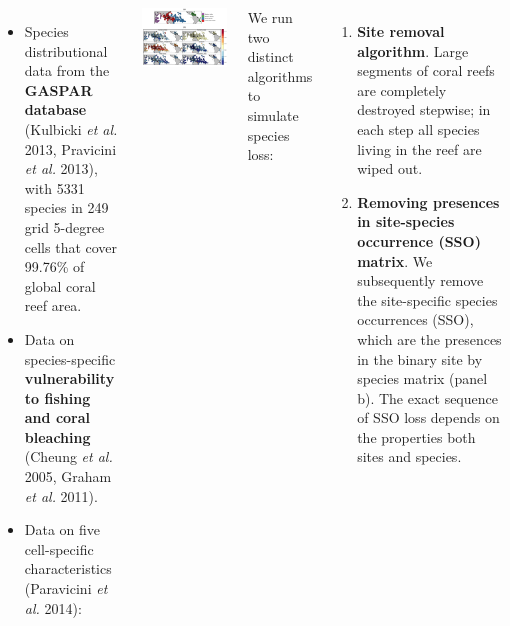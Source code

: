 \documentclass[25pt, a0paper, portrait, margin=0mm, innermargin=15mm,
     blockverticalspace=15mm, colspace=15mm, subcolspace=8mm]{tikzposter}
\begin{document}
\begin{columns}
{
	\begin{itemize}
		\item Species distributional data from the
		 \textbf{GASPAR database} (Kulbicki \textit{et al.} 2013, 
		 Pravicini \textit{et al.} 2013), with 5331 species in 
		 249 grid 5-degree cells that cover 99.76\% of 
		 global coral reef area. 
		\item Data on species-specific \textbf{vulnerability
		to fishing and coral bleaching} 
		(Cheung 	\textit{et al.} 2005, Graham \textit{et al.} 2011).
		\item Data on five cell-specific 
		characteristics (Paravicini \textit{et al.} 2014):
	\end{itemize}
	\begin{center}
		{\includegraphics[scale=1.4]{Figure_1.pdf}}	
	\end{center}
}


{
	We run two distinct algorithms to simulate species loss:
	\begin{enumerate}
		\item \textbf{Site removal algorithm}. Large segments 
		of coral reefs are completely destroyed stepwise; in each step 
		all species living in the reef are wiped out.
		\item \textbf{Removing presences in site-species 
		occurrence (SSO) matrix}. We subsequently remove the 
		site-specific species occurrences (SSO), which are the
		presences in the binary site by species
		matrix (panel b). The exact sequence of SSO loss
		depends on the properties both sites and species. 
	\end{enumerate}

}
\end{columns}
\end{document}
